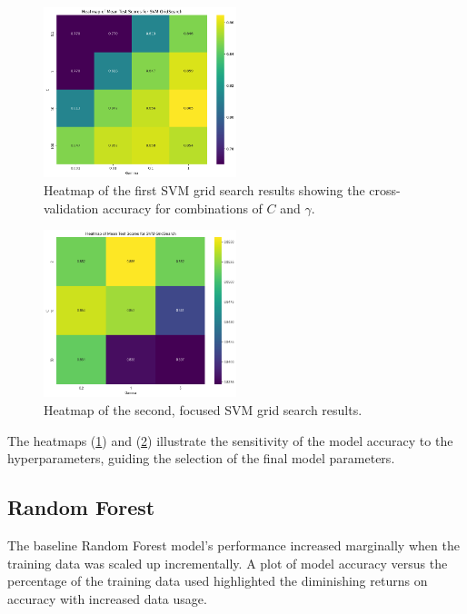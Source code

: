 \documentclass[conference]{IEEEtran}
\begin{document}
	\begin{figure}[htbp]
		\centering
		\includegraphics[width=0.5\textwidth]{svm_heatmap1.png}
		\caption{Heatmap of the first SVM grid search results showing the cross-validation accuracy for combinations of $C$ and $\gamma$.}
		\label{fig:svm_heatmap1}
	\end{figure}
	
	\begin{figure}[htbp]
		\centering
		\includegraphics[width=0.5\textwidth]{svm_heatmap2.png}
		\caption{Heatmap of the second, focused SVM grid search results.}
		\label{fig:svm_heatmap2}
	\end{figure}
	
	The heatmaps (\ref{fig:svm_heatmap1}) and (\ref{fig:svm_heatmap2}) illustrate the sensitivity of the model accuracy to the hyperparameters, guiding the selection of the final model parameters.
	
	\subsection{Random Forest}
	The baseline Random Forest model's performance increased marginally when the training data was scaled up incrementally. A plot of model accuracy versus the percentage of the training data used highlighted the diminishing returns on accuracy with increased data usage.
	
\end{document}
